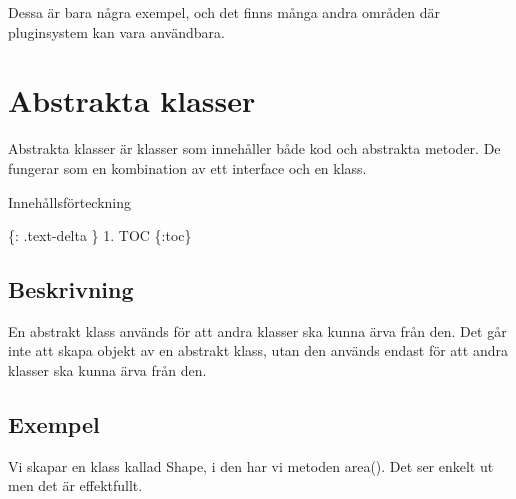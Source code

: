 Dessa är bara några exempel, och det finns många andra områden där
pluginsystem kan vara användbara.

\hypertarget{abstrakta-klasser}{%
\section{Abstrakta klasser}\label{abstrakta-klasser}}

Abstrakta klasser är klasser som innehåller både kod och abstrakta
metoder. De fungerar som en kombination av ett interface och en klass.

Innehållsförteckning

\{: .text-delta \} 1. TOC \{:toc\}

\hypertarget{beskrivning}{%
\subsection{Beskrivning}\label{beskrivning}}

En abstrakt klass används för att andra klasser ska kunna ärva från den.
Det går inte att skapa objekt av en abstrakt klass, utan den används
endast för att andra klasser ska kunna ärva från den.

\hypertarget{exempel}{%
\subsection{Exempel}\label{exempel}}

Vi skapar en klass kallad Shape, i den har vi metoden area(). Det ser
enkelt ut men det är effektfullt.

